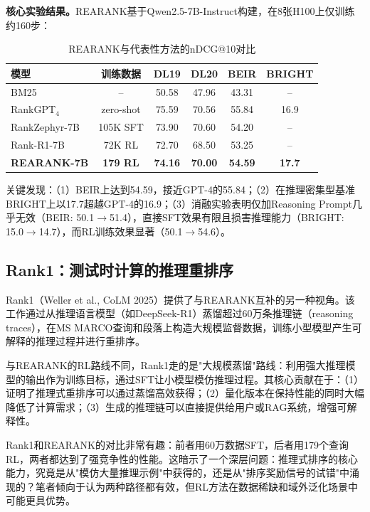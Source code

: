 \documentclass[12pt,a4paper]{article}
\begin{document}
\textbf{核心实验结果。}REARANK基于Qwen2.5-7B-Instruct构建，在8张H100上仅训练约160步：

\begin{table}[H]
\centering
\caption{REARANK与代表性方法的nDCG@10对比}
\label{tab:main_results}
\begin{tabular}{lccccc}
\toprule
\textbf{模型} & \textbf{训练数据} & \textbf{DL19} & \textbf{DL20} & \textbf{BEIR} & \textbf{BRIGHT} \\
\midrule
BM25 & -- & 50.58 & 47.96 & 43.31 & -- \\
RankGPT$_4$ & zero-shot & 75.59 & 70.56 & 55.84 & 16.9 \\
RankZephyr-7B & 105K SFT & 73.90 & 70.60 & 54.20 & -- \\
Rank-R1-7B & 72K RL & 72.70 & 68.50 & 53.25 & -- \\
\textbf{REARANK-7B} & \textbf{179 RL} & \textbf{74.16} & \textbf{70.00} & \textbf{54.59} & \textbf{17.7} \\
\bottomrule
\end{tabular}
\end{table}

关键发现：（1）BEIR上达到54.59，接近GPT-4的55.84；（2）在推理密集型基准BRIGHT上以17.7超越GPT-4的16.9；（3）消融实验表明仅加Reasoning Prompt几乎无效（BEIR: 50.1$\to$51.4），直接SFT效果有限且损害推理能力（BRIGHT: 15.0$\to$14.7），而RL训练效果显著（50.1$\to$54.6）。

\subsection{Rank1：测试时计算的推理重排序}

Rank1\cite{weller2025rank1}（Weller et al., CoLM 2025）提供了与REARANK互补的另一种视角。该工作通过从推理语言模型（如DeepSeek-R1）蒸馏超过60万条推理链（reasoning traces），在MS MARCO查询和段落上构造大规模监督数据，训练小型模型产生可解释的推理过程并进行重排序。

与REARANK的RL路线不同，Rank1走的是"大规模蒸馏"路线：利用强大推理模型的输出作为训练目标，通过SFT让小模型模仿推理过程。其核心贡献在于：（1）证明了推理式重排序可以通过蒸馏高效获得；（2）量化版本在保持性能的同时大幅降低了计算需求；（3）生成的推理链可以直接提供给用户或RAG系统，增强可解释性。

Rank1和REARANK的对比非常有趣：前者用60万数据SFT，后者用179个查询RL，两者都达到了强竞争性的性能。这暗示了一个深层问题：推理式排序的核心能力，究竟是从"模仿大量推理示例"中获得的，还是从"排序奖励信号的试错"中涌现的？笔者倾向于认为两种路径都有效，但RL方法在数据稀缺和域外泛化场景中可能更具优势。
\end{document}
